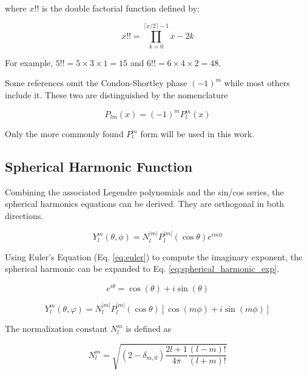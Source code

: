 \documentclass{article}
\numberwithin{equation}{subsection}
\begin{document}
where $x!!$ is the double factorial function defined by:

\begin{equation}
x!! = \prod_{k=0}^{\lceil x/2 \rceil - 1} x-2k
\end{equation}

For example, $5!! = 5 \times 3 \times 1 = 15$ and $6!! = 6 \times 4 \times 2 = 48$.

Some references omit the Condon-Shortley phase $(-1)^m$ while most others include it. These two are distinguished by the nomenclature

\begin{equation}
P_{lm}(x) = (-1)^m P_l^m(x)
\end{equation}

Only the more commonly found $P_l^m$ form will be used in this work.

\subsection{Spherical Harmonic Function}

Combining the associated Legendre polynomials and the sin/cos series, the spherical harmonics equations can be derived. They are orthogonal in both directions.

\begin{equation}\label{eq:spherical_harmonic}
Y_l^m(\theta, \phi) = N_l^{|m|} P_l^{|m|}(\cos \theta) e^{i m \phi}
\end{equation}

Using Euler's Equation (Eq. \ref{eq:euler}) to compute the imaginary exponent, the spherical harmonic can be expanded to Eq. \ref{eq:spherical_harmonic_exp}.

\begin{equation}\label{eq:euler}
e^{i \theta} = \cos(\theta) + i \sin(\theta)
\end{equation}

\begin{equation}\label{eq:spherical_harmonic_exp}
Y_l^m(\theta, \varphi) = N_l^{|m|} P_l^{|m|}(\cos \theta) \left[ \cos(m \phi) + i \sin(m \phi) \right]
\end{equation}

The normalization constant $N_l^m$ is defined as

\begin{equation}
N_l^m = \sqrt{(2-\delta_{m,0}) \frac{2l+1}{4 \pi} \frac{(l-m)!}{(l+m)!}}
\end{equation}
\end{document}
